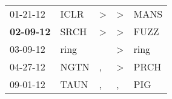 \begin{supertabular}{p{0.07\textwidth}p{0.06\textwidth}p{0.02\textwidth}p{0.02\textwidth}p{0.06\textwidth}}
          01-21-12\textsuperscript{} &  ICLR\textsuperscript{} &  \textgreater &  \textgreater &  MANS\textsuperscript{} \\
 \textbf{02-09-12\textsuperscript{}} &  SRCH\textsuperscript{} &  \textgreater &  \textgreater &  FUZZ\textsuperscript{} \\
          03-09-12\textsuperscript{} &  ring\textsuperscript{} &               &  \textgreater &  ring\textsuperscript{} \\
          04-27-12\textsuperscript{} &  NGTN\textsuperscript{} &             , &  \textgreater &  PRCH\textsuperscript{} \\
          09-01-12\textsuperscript{} &  TAUN\textsuperscript{} &             , &             , &   PIG\textsuperscript{} \\
\end{supertabular}
